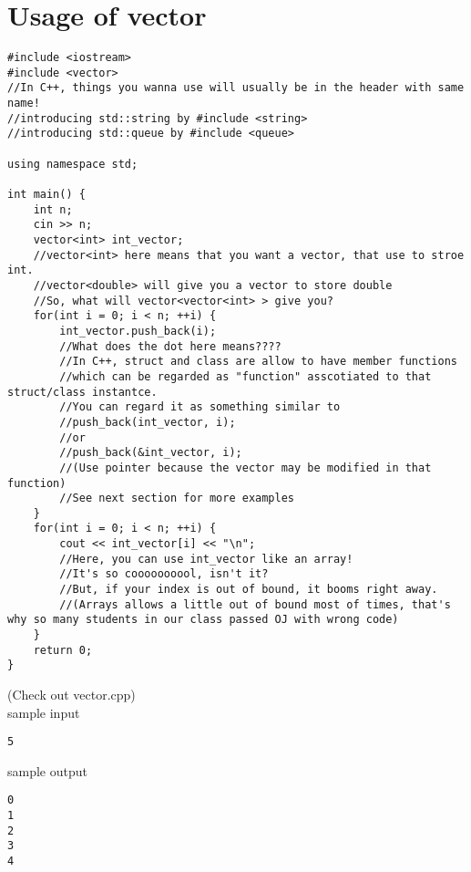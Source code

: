 \documentclass{article}
\begin{document}
\section{Usage of vector}
\begin{lstlisting}
#include <iostream>
#include <vector>
//In C++, things you wanna use will usually be in the header with same name!
//introducing std::string by #include <string>
//introducing std::queue by #include <queue>

using namespace std;

int main() {
    int n;
    cin >> n;
    vector<int> int_vector;
    //vector<int> here means that you want a vector, that use to stroe int.
    //vector<double> will give you a vector to store double
    //So, what will vector<vector<int> > give you?
    for(int i = 0; i < n; ++i) {
        int_vector.push_back(i);
        //What does the dot here means????
        //In C++, struct and class are allow to have member functions
        //which can be regarded as "function" asscotiated to that struct/class instantce.
        //You can regard it as something similar to
        //push_back(int_vector, i);
        //or
        //push_back(&int_vector, i);
        //(Use pointer because the vector may be modified in that function)
        //See next section for more examples
    }
    for(int i = 0; i < n; ++i) {
        cout << int_vector[i] << "\n";
        //Here, you can use int_vector like an array!
        //It's so coooooooool, isn't it?
        //But, if your index is out of bound, it booms right away.
        //(Arrays allows a little out of bound most of times, that's why so many students in our class passed OJ with wrong code)
    }
    return 0;
}

\end{lstlisting}
(Check out vector.cpp)\\
sample input
\begin{lstlisting}
5
\end{lstlisting}
sample output
\begin{lstlisting}
0
1
2
3
4
\end{lstlisting}
\end{document}
